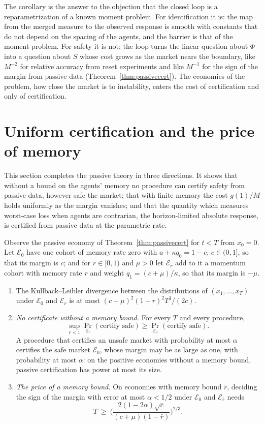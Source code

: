 The corollary is the answer to the objection that the closed loop is a reparametrization of a known moment problem. For identification it is: the map from the merged measure to the observed response is smooth with constants that do not depend on the spacing of the agents, and the barrier is that of the moment problem. For safety it is not: the loop turns the linear question about $\Phi$ into a question about $S$ whose cost grows as the market nears the boundary, like $M^{-2}$ for relative accuracy from reset experiments and like $M^{-1}$ for the sign of the margin from passive data (Theorem~\ref{thm:passivecert}). The economics of the problem, how close the market is to instability, enters the cost of certification and only of certification.

\section{Uniform certification and the price of memory}\label{sec:uniform}

This section completes the passive theory in three directions. It shows that without a bound on the agents' memory no procedure can certify safety from passive data, however safe the market; that with finite memory the cost $g(1)/M$ holds uniformly as the margin vanishes; and that the quantity which measures worst-case loss when agents are contrarian, the horizon-limited absolute response, is certified from passive data at the parametric rate.

\begin{theorem}\label{thm:hidden}
Observe the passive economy of Theorem~\ref{thm:passivecert} for $t<T$ from $x_0=0$. Let $\mathcal E_0$ have one cohort of memory rate zero with $a+\kappa q_0=1-c$, $c\in(0,1]$, so that its margin is $c$; and for $r\in[0,1)$ and $\mu>0$ let $\mathcal E_r$ add to it a momentum cohort with memory rate $r$ and weight $q_1=(c+\mu)/\kappa$, so that its margin is $-\mu$.
\begin{enumerate}[label=(\roman*)]
\item The Kullback--Leibler divergence between the distributions of $(x_1,\dots,x_T)$ under $\mathcal E_0$ and $\mathcal E_r$ is at most $(c+\mu)^2(1-r)^2T^3/(2c)$.
\item \emph{No certificate without a memory bound.} For every $T$ and every procedure,
\[
\sup_{r<1}\Pr_{\mathcal E_r}(\text{certify safe})\ge\Pr_{\mathcal E_0}(\text{certify safe}).
\]
A procedure that certifies an unsafe market with probability at most $\alpha$ certifies the safe market $\mathcal E_0$, whose margin may be as large as one, with probability at most $\alpha$: on the positive economies without a memory bound, passive certification has power at most its size.
\item \emph{The price of a memory bound.} On economies with memory bound $\bar r$, deciding the sign of the margin with error at most $\alpha<1/2$ under $\mathcal E_0$ and $\mathcal E_{\bar r}$ needs
\[
T\ \ge\ \Big(\frac{2(1-2\alpha)\sqrt c}{(c+\mu)(1-\bar r)}\Big)^{2/3}.
\]
\end{enumerate}
\hfill\Proved
\end{theorem}

